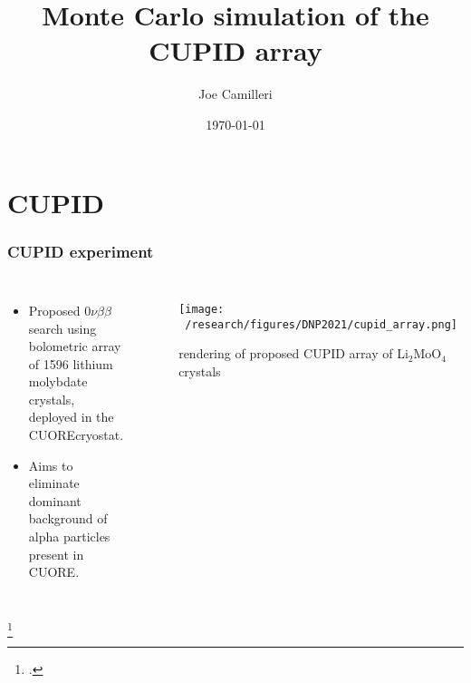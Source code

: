\documentclass{beamer}
\title[CUPID array]{Monte Carlo simulation of the CUPID array} %
\author{Joe Camilleri} %
\institute[Virginia Tech] %
{
	DNP October 2021 \\ %
	\medskip
	\textit{jcamilleri@vt.edu} %
}
\date{\today} %
\begin{document}
	
	\begin{frame}
		\titlepage %
	\end{frame}
	
	
	
	\section{CUPID}
	\begin{frame}
		\frametitle{CUPID experiment}
		\begin{columns}[c] %
			
			\begin{itemize}
				\item Proposed $0\nu\beta\beta$ search using bolometric array of 1596 lithium molybdate crystals, deployed in the CUORE\footnotemark cryostat.
				\item Aims to eliminate dominant background of alpha particles present in CUORE.
			\end{itemize}
			
			\begin{figure}
			\texttt{[image: ~/research/figures/DNP2021/cupid\_array.png]}
			\caption{rendering of proposed CUPID array of Li$_2$MoO$_4$ crystals}
			\end{figure}
			
		\end{columns}
		\footcitetext{squid}
	\end{frame}
	
\end{document}

